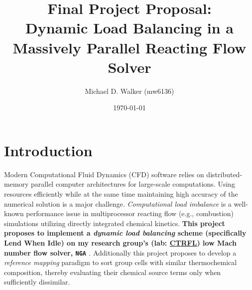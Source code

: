 \documentclass{homework}
\author{Michael D. Walker (mw6136)}
\date{\today}
\title{Final Project Proposal: \\ Dynamic Load Balancing in a Massively Parallel Reacting Flow Solver}
\begin{document}
 \maketitle
\section{\textbf{Introduction}}
\noindent Modern Computational Fluid Dynamics (CFD) software relies on distributed-memory parallel computer architectures for large-scale computations. Using resources efficiently while at the same time maintaining high accuracy of the numerical solution is a major challenge. \emph{Computational load imbalance} is a well-known performance issue in multiprocessor reacting flow (e.g., combustion) simulations utilizing directly integrated chemical kinetics. \noindent \textbf{This project proposes to implement a \emph{dynamic load balancing} scheme (specifically Lend When Idle) on my research group's (lab: \href{https://ctrfl.princeton.edu/}{CTRFL}) low Mach number flow solver, \texttt{NGA} \cite{DESJARDINS2008,MACART2016}}. Additionally this project proposes to develop a \emph{reference mapping} paradigm to sort group cells with similar thermochemical composition, thereby evaluating their chemical source terms only when sufficiently dissimilar.
\end{document}
